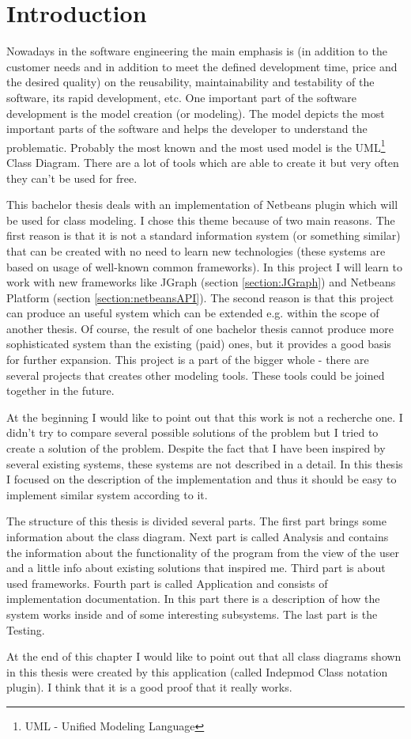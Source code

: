 \chapter{Introduction}

Nowadays in the software engineering the main emphasis is (in addition to the customer needs and in addition to meet the defined development time, price and the desired quality) on the reusability, maintainability and testability of the software, its rapid development, etc. One important part of the software development is the model creation (or modeling). The model depicts the most important parts of the software and helps the developer to understand the problematic. Probably the most known and the most used model is the UML\footnote{UML - Unified Modeling Language} Class Diagram. There are a lot of tools which are able to create it but very often they can't be used for free.

This bachelor thesis deals with an implementation of Netbeans plugin which will be used for class modeling. I chose this theme because of two main reasons. The first reason is that it is not a standard information system (or something similar) that can be created with no need to learn new technologies (these systems are based on usage of well-known common frameworks). In this project I will learn to work with new frameworks like JGraph (section \ref{section:JGraph}) and Netbeans Platform (section \ref{section:netbeansAPI}). The second reason is that this project can produce an useful system which can be extended e.g. within the scope of another thesis. Of course, the result of one bachelor thesis cannot produce more sophisticated system than the existing (paid) ones, but it provides a good basis for further expansion. This project is a part of the bigger whole - there are several projects that creates other modeling tools. These tools could be joined together in the future.

At the beginning I would like to point out that this work is not a recherche one. I didn't try to compare several possible solutions of the problem but I tried to create a solution of the problem. Despite the fact that I have been inspired by several existing systems, these systems are not described in a detail. In this thesis I focused on the description of the implementation and thus it should be easy to implement similar system according to it.

The structure of this thesis is divided several parts. The first part brings some information about the class diagram. Next part is called Analysis and contains the information about the functionality of the program from the view of the user and a little info about existing solutions that inspired me. Third part is about used frameworks. Fourth part is called Application and consists of implementation documentation. In this part there is a description of how the system works inside and of some interesting subsystems. The last part is the Testing.

At the end of this chapter I would like to point out that all class diagrams shown in this thesis were created by this application (called Indepmod Class notation plugin). I think that it is a good proof that it really works.

